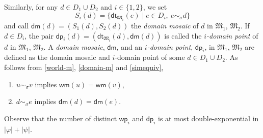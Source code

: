 \documentclass{lmcs} %
\theoremstyle{plain}\newtheorem{satz}[thm]{Satz} %
\newcommand{\dt}{\mathsf{dt}}
\newcommand{\wm}{\mathsf{wm}}
\newcommand{\dm}{\mathsf{dm}}
\newcommand{\iwp}{\mathsf{wp}_i}
\newcommand{\idp}{\mathsf{dp}_i}
\begin{document}
Similarly, for any $d\in D_{1}\cup D_{2}$ and $i \in \{1,2\}$, we set
%
\begin{equation}\label{domain-m}
S_{i}(d) = \{ \dt_{\mathfrak{M}_{i}}(e) \mid e \in D_{i}, \ e \sim_{\sigma} d\}
\end{equation}
%
and call $\dm(d) = (S_{1}(d),S_{2}(d))$ the \emph{domain mosaic} of $d$ in $\mathfrak{M}_{1}$, $\mathfrak{M}_{2}$. If $d\in D_{i}$, the pair $\idp(d) = (\dt_{\mathfrak{M}_{i}}(d), \dm(d))$ is called the \emph{$i$-domain point} of $d$ in $\mathfrak{M}_{1}$, $\mathfrak{M}_{2}$. A \emph{domain mosaic}, $\dm$, and an  \emph{$i$-domain point}, $\idp$, in $\mathfrak{M}_{1}$, $\mathfrak{M}_{2}$ are defined as the domain mosaic and $i$-domain point of some $d\in D_{1} \cup D_2$. As follows from \eqref{world-m}, \eqref{domain-m} and \eqref{simequiv},
%
\begin{enumerate}[style=multiline,leftmargin=1.1cm]
\item[\textbf{(wm)}] $u \sim_{\sigma} v$ implies $\wm(u) = \wm(v)$,
 
\item[\textbf{(dm)}] $d \sim_{\sigma} e$ implies $\dm(d) = \dm(e)$.
\end{enumerate}
%
Observe that the number of distinct $\iwp$ and $\idp$ is at most double-exponential in  $|\varphi|+|\psi|$. 
%
\end{document}

